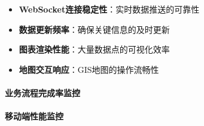 \begin{itemize}
\tightlist
\item
  \textbf{WebSocket连接稳定性}：实时数据推送的可靠性
\item
  \textbf{数据更新频率}：确保关键信息的及时更新
\item
  \textbf{图表渲染性能}：大量数据点的可视化效率
\item
  \textbf{地图交互响应}：GIS地图的操作流畅性
\end{itemize}

\paragraph{业务流程完成率监控}\label{ux4e1aux52a1ux6d41ux7a0bux5b8cux6210ux7387ux76d1ux63a7}

\begin{Shaded}
\begin{Highlighting}[]
    \OperatorTok{=} \NormalTok{()}
    
    \NormalTok{ \{}
      \OperatorTok{:}\NormalTok{ () }\KeywordTok{=\textgreater{}}\NormalTok{ \{}
        \OperatorTok{=} \NormalTok{() }\OperatorTok{{-}}
        \OperatorTok{,}\OperatorTok{,} \NormalTok{)}
\NormalTok{      \}}\OperatorTok{,}
      \OperatorTok{:}\KeywordTok{=\textgreater{}}\NormalTok{ \{}
        \OperatorTok{,} \OperatorTok{,} \OperatorTok{,}
\NormalTok{      \}}
\NormalTok{    \}}
\NormalTok{  \}}
\NormalTok{\}}
\end{Highlighting}
\end{Shaded}

\paragraph{移动端性能监控}\label{ux79fbux52a8ux7aefux6027ux80fdux76d1ux63a7}

